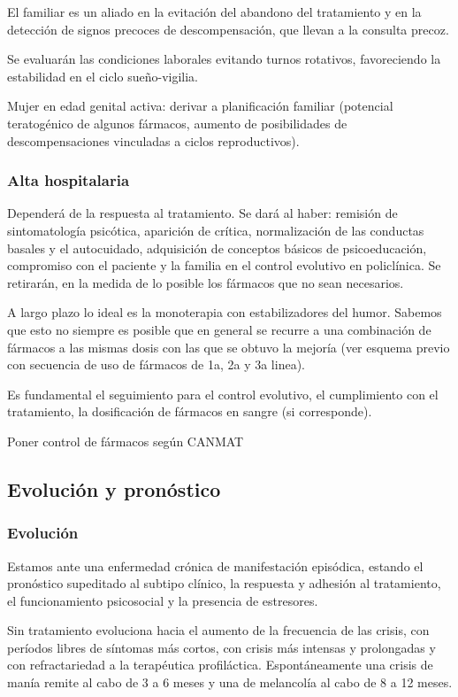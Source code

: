 El familiar es un aliado en la evitación del abandono del tratamiento y en la detección de signos precoces de descompensación, que llevan a la consulta precoz.

Se evaluarán las condiciones laborales evitando turnos rotativos, favoreciendo la estabilidad en el ciclo sueño-vigilia.

Mujer en edad genital activa: derivar a planificación familiar (potencial teratogénico de algunos fármacos, aumento de posibilidades de descompensaciones vinculadas a ciclos reproductivos).
\subsubsection*{Alta hospitalaria}
Dependerá de la respuesta al tratamiento. Se dará al haber: remisión de sintomatología psicótica, aparición de crítica, normalización de las conductas basales y el autocuidado, adquisición de conceptos básicos de psicoeducación, compromiso con el paciente y la familia en el control evolutivo en policlínica. Se retirarán, en la medida de lo posible los fármacos que no sean necesarios.

A largo plazo lo ideal es la monoterapia con estabilizadores del humor. Sabemos que esto no siempre es posible que en general se recurre a una combinación de fármacos a las mismas dosis con las que se obtuvo la mejoría (ver esquema previo con secuencia de uso de fármacos de 1a, 2a y 3a linea).

Es fundamental el seguimiento para el control evolutivo, el cumplimiento con el tratamiento, la dosificación de fármacos en sangre (si corresponde).

\faTasks Poner control de fármacos según CANMAT

\subsection*{Evolución y pronóstico}
\subsubsection*{Evolución}
Estamos ante una enfermedad crónica de manifestación episódica, estando el pronóstico supeditado al subtipo clínico, la respuesta y adhesión al tratamiento, el funcionamiento psicosocial y la presencia de estresores.

Sin tratamiento evoluciona hacia el aumento de la frecuencia de las crisis, con períodos libres de síntomas más cortos, con crisis más intensas y prolongadas y con refractariedad a la terapéutica profiláctica. Espontáneamente una crisis de manía remite al cabo de 3 a 6 meses y una de melancolía al cabo de 8 a 12 meses.

